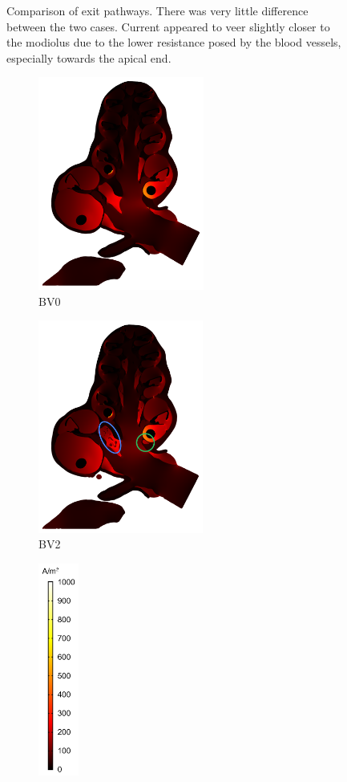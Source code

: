 \begin{figure}[p]
    \caption[Comparison of exit pathways]{Comparison of exit pathways. There
    was very little difference between the two cases. Current appeared to veer
    slightly closer to the modiolus due to the lower resistance posed by the
    blood vessels, especially towards the apical end.}
	\label{fig:vasc_streams}
\end{figure}

\begin{figure}[p]
	\centering
	
	\begin{subfigure}[t]{0.44\textwidth}
        \centering
        \includegraphics[height=7cm]{Simulations/Vasculature/heatmap-BV-noBV-edit}
        \caption{BV0}
        \label{fig:vasc_heat_noBV}
    \end{subfigure}%
    \hfill%
    \begin{subfigure}[t]{0.44\textwidth}
        \centering
        \includegraphics[height=7cm]{Simulations/Vasculature/heatmap-BV-allBV-edit}
        \caption{BV2}
        \label{fig:vasc_heat_allBV}
    \end{subfigure}%
    \hfill%
    \begin{subfigure}[t]{0.09\textwidth}
        \centering
        \includegraphics[height=7cm]{Simulations/Vasculature/cbar_heatmap}

\end{subfigure}
\end{figure}
